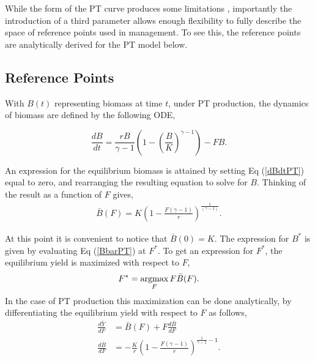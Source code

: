 %
While the form of the PT curve produces some limitations \cite{fletcher_restructuring_1978}, %
importantly the %
introduction of a third parameter allows enough flexibility to fully describe
the space of reference points used in management. To see this, the reference
points are analytically derived for the PT model below. %

%
\subsection{Reference Points}\label{ptRef}
%
With $B(t)$ representing biomass at time $t$, under PT production, the
dynamics of biomass are defined by the following ODE,

\begin{equation}
\frac{dB}{dt} = \frac{r B}{\gamma-1} \left(1-\left(\frac{B}{K}\right)^{\gamma-1}\right) - FB. \label{dBdtPT}
\end{equation}

An expression for the equilibrium biomass is attained by setting Eq (\ref{dBdtPT})
equal to zero, and rearranging the resulting equation to solve for $B$.
Thinking of the result as a function of $F$ gives,
\begin{align}
\bar B(F) = K\left(1-\frac{F(\gamma-1)}{r}\right)^{\frac{1}{(\gamma-1)}}. \label{BbarPT}
\end{align}

At this point it is convenient to notice that $\bar B(0)=K$. The expression for
$B^*$ is given by evaluating Eq (\ref{BbarPT}) at $F^*$.
%
To get an expression for $F^*$, the equilibrium yield is maximized with respect to $F$,
\begin{equation}
F^* = \argmax_F F\bar B(F).
\end{equation}
%
In the case of PT production this maximization can be done analytically, %
by differentiating the equilibrium yield with respect to $F$ as follows,
%
\begin{align}
\frac{d \bar{Y}}{dF} &= \bar B(F) + F \frac{d \bar B}{dF} \label{FderivPT}\\
\frac{d \bar B}{dF} &= -\frac{K}{r}\left(1-\frac{F(\gamma-1)}{r}\right)^{\frac{1}{\gamma-1}-1}\label{dBdFPT}.
\end{align}

